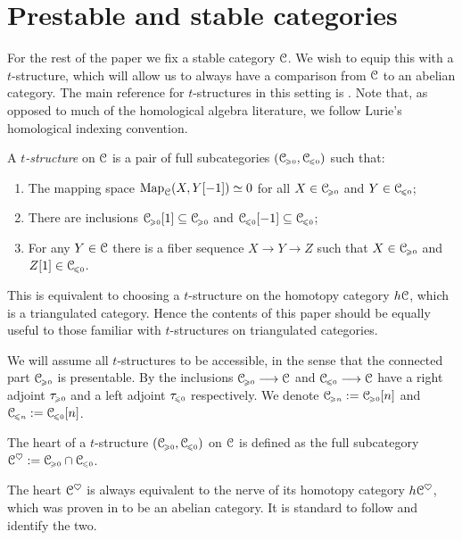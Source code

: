 
\section{Prestable and stable categories}
\label{ch3:sec:prestable-and-stable-categories}

For the rest of the paper we fix a stable category $\C$. We wish to equip this with a $t$-structure, which will allow us to always have a comparison from $\C$ to an abelian category. The main reference for $t$-structures in this setting is \cite[Sec 1.2.1]{Lurie_HA}. Note that, as opposed to much of the homological algebra literature, we follow Lurie's homological indexing convention.  

\begin{definition}
    A \emph{$t$-structure} on $\C$ is a pair of full subcategories $(\C\geqz, \C\leqz)$ such that:
    \begin{enumerate}
        \item The mapping space $\Map_\C(X,Y[-1])\simeq 0$ for all $X\in \C\geqz$ and $Y\in \C\leqz$;
        \item There are inclusions $\C\geqz[1]\subseteq \C\geqz$ and $\C\leqz[-1]\subseteq \C\leqz$;
        \item For any $Y\in \C$ there is a fiber sequence $X\to Y\to Z$ such that $X\in \C\geqz$ and $Z[1]\in \C\leqz$. 
    \end{enumerate} 
\end{definition}

This is equivalent to choosing a $t$-structure on the homotopy category $h\C$, which is a triangulated category. Hence the contents of this paper should be equally useful to those familiar with $t$-structures on triangulated categories. 

We will assume all $t$-structures to be accessible, in the sense that the connected part $\C\geqz$ is presentable. By \cite[1.2.16]{Lurie_HA} the inclusions $\C\geqz\to \C$ and $\C\leqz\to \C$ have a right adjoint $\tau\geqz$ and a left adjoint $\tau\leqz$ respectively. We denote $\C\geqn := \C\geqz[n]$ and $\C\leqn := \C\leqz[n]$. 

\begin{definition}
    The heart of a $t$-structure $(\C\geqz, \C\leqz)$ on $\C$ is defined as the full subcategory $\C^\heart := \C\geqz\cap\C\leqz$.
\end{definition}

The heart $\C^\heart$ is always equivalent to the nerve of its homotopy category $h\C^\heart$, which was proven in \cite{beilinson-bernstein-deligne_1983} to be an abelian category. It is standard to follow \cite[1.2.1.12]{Lurie_HA} and identify the two. 

